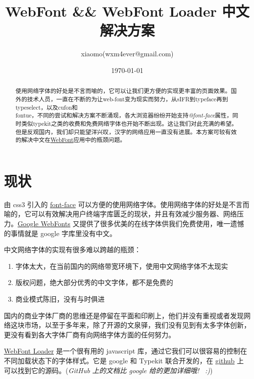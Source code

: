\documentclass[a4paper,12pt]{report}
\begin{document}
\author{xiaomo(wxm4ever@gmail.com)}
\title{\Large{WebFont \&\& WebFont Loader 中文解决方案}}
\date{\today}

\clearpage
\thispagestyle{empty}

\maketitle
\begin{abstract}

使用网络字体的好处是不言而喻的，它可以让我们更方便的实现更丰富的页面效果。国外的技术人员，一直在不断的为让web-font变为现实而努力，从sIFR到typeface再到typeselect，以及cufon和\\fontue，不同的尝试和解决方案不断涌现，各大浏览器纷纷开始支持\emph{@font-face}属性，同时类似typekit之类的收费和免费网络字体也开始不断出现。这让我们对此充满的希望。但是反观国内，我们却只能望洋兴叹，汉字的网络应用一直没有进展。本方案可较有效的解决中文在\underline{WebFont}应用中的瓶颈问题。

\end{abstract}

\newpage
\setcounter{page}{1} 

\chapter{现状}

由 css3 引入的 \href{http://www.w3schools.com/cssref/css3_pr_font-face_rule.asp}{font-face} 可以方便的使用网络字体。使用网络字体的好处是不言而喻的，它可以有效解决用户终端字库匮乏的现状，并且有效减少服务器、网络压力。\href{http://www.google.com/webfonts/}{Google WebFonts} 又提供了很多优美的在线字体供我们免费使用，唯一遗憾的事情就是 google 字库里没有中文。

中文网络字体的实现有很多难以跨越的瓶颈：

\begin{enumerate}
    \item 字体太大，在当前国内的网络带宽环境下，使用中文网络字体不太现实
    \item 版权问题，绝大部分优秀的中文字体，都不是免费的
    \item 商业模式陈旧，没有与时俱进
\end{enumerate}

国内的商业字体厂商的思维还是停留在平面和印刷上，他们并没有重视或者发现网络这块市场，以至于多年来，除了开源的文泉驿，我们没有见到有太多字体创新，更没有看到各大字体厂商有向网络字体方面的任何努力。

\href{https://developers.google.com/webfonts/docs/webfont_loader}{WebFont Loader} 是一个很有用的 javascript 库，通过它我们可以很容易的控制在不同加载状态下的字体样式。它是 google 和 Typekit 联合开发的，在 \href{https://github.com/typekit/webfontloader}{github} 上可以找到它的源码。(\emph{GitHub 上的文档比 google 给的更加详细哦!~ :)})
\end{document}
